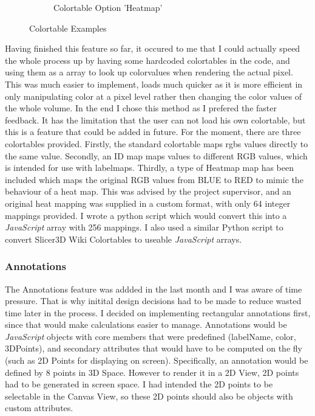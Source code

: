\documentclass[a4paper,11pt,twoside]{article}
\begin{document}
\begin{figure}
\begin{subfigure}{.33\textwidth}
  \caption{Colortable Option 'Heatmap'}
\end{subfigure}
\caption{Colortable Examples}

\end{figure}


Having finished this feature so far, it occured to me that I could actually speed the whole process up by having some hardcoded colortables in the code, and using them as a array to look up colorvalues when rendering the actual pixel. This was much easier to implement, loads much quicker as it is more efficient in only manipulating color at a pixel level rather then changing the color values of the whole volume. In the end I chose this method as I prefered the faster feedback. It has the limitation that the user can not load his own colortable, but this is a feature that could be added in future. For the moment, there are three colortables provided. Firstly, the standard colortable maps rgbs values directly to the same value. Secondly, an ID map maps values to different RGB values, which is intended for use with labelmaps. Thirdly, a type of Heatmap map has been included which maps the original RGB values from BLUE to RED to mimic the behaviour of a heat map. This was advised by the project supervisor, and an original heat mapping was supplied in a custom format, with only 64 integer mappings provided. I wrote a python script which would convert this into a \textit{JavaScript} array with 256 mappings. I also used a similar Python script to convert Slicer3D Wiki Colortables to useable \textit{JavaScript} arrays.



\subsubsection{Annotations}



The Annotations feature was addded in the last month and I was aware of time pressure. That is why initital design decisions had to be made to reduce wasted time later in the process. I decided on implementing rectangular annotations first, since that would make calculations easier to manage. Annotations would be \textit{JavaScript} objects with core members that were predefined (labelName, color, 3DPoints), and secondary attributes that would have to be computed on the fly (such as 2D Points for displaying on screen). Specifically, an annotation would be defined by 8 points in 3D Space. However to render it in a 2D View, 2D points had to be generated in screen space. I had intended the 2D points to be selectable in the Canvas View, so these 2D points should also be objects with custom attributes.
\end{document}
